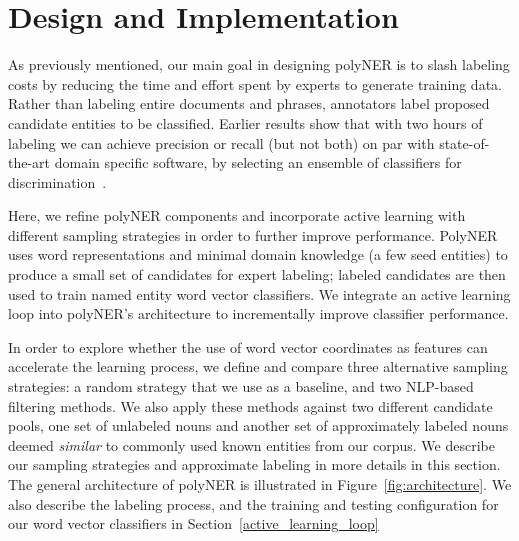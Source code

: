 \section{Design and Implementation}
\label{sect:apner_architecture}
As previously mentioned, our main goal in designing polyNER is to slash labeling costs by reducing the time and effort spent by experts to generate training data. 
Rather than labeling entire documents and phrases, annotators label proposed candidate entities to be classified.
Earlier results show that with two hours of labeling we can achieve
precision or recall (but not both) on par with state-of-the-art domain specific software, by selecting an ensemble of classifiers for discrimination~\cite{tchoua2019polyner}. %

Here, we refine polyNER components and incorporate active learning with different sampling strategies in order to further improve performance.
PolyNER uses word representations and minimal domain knowledge (a few
seed entities) to produce a small set of candidates for expert labeling;
labeled candidates are then used to train named entity word vector classifiers.
We integrate an active learning loop into polyNER's architecture to incrementally improve classifier performance.

In order to explore whether the use of word vector coordinates as features can accelerate the learning process,
we define and compare three alternative sampling strategies: a random strategy that we use as a baseline,
and two NLP-based filtering methods. 
We also apply these methods against two different candidate pools, 
one set of unlabeled nouns and another set of approximately labeled nouns deemed \textit{similar} to commonly used known entities from our corpus.
We describe our sampling strategies and approximate labeling in more details in this section.
The general architecture of polyNER is illustrated in Figure~\ref{fig:architecture}.
We also describe the labeling process, and the training and testing configuration for our word vector classifiers in 
Section~\ref{active_learning_loop}


